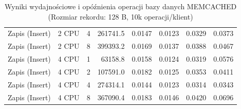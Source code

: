 \begin{table}[ht]
{\begin{tabular}{llcrrrrr}
Zapis (Insert) & 2 CPU & 4 & 261741.5 & 0.0147 & 0.0123 & 0.0329 & 0.0373 \\
Zapis (Insert) & 2 CPU & 8 & 399393.2 & 0.0169 & 0.0137 & 0.0388 & 0.0467 \\
Zapis (Insert) & 4 CPU & 1 & 63158.8 & 0.0158 & 0.0124 & 0.0319 & 0.0576 \\
Zapis (Insert) & 4 CPU & 2 & 107591.0 & 0.0182 & 0.0125 & 0.0353 & 0.0411 \\
Zapis (Insert) & 4 CPU & 4 & 274314.1 & 0.0144 & 0.0123 & 0.0314 & 0.0343 \\
Zapis (Insert) & 4 CPU & 8 & 367090.4 & 0.0183 & 0.0146 & 0.0420 & 0.0696 \\
\bottomrule
\end{tabular}%
}
\caption{Wyniki wydajnościowe i opóźnienia operacji bazy danych MEMCACHED (Rozmiar rekordu: 128 B, 10k operacji/klient)}
\label{tab:latency_memcached_small_10000}
\end{table}
